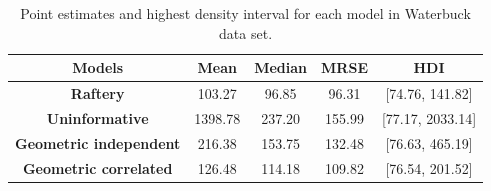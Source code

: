 \begin{table}[!ht]
    \centering
    \begin{tabular}{|c|c|c|c|c|}
        \hline
        {\bf Models} &     {\bf Mean} &  {\bf Median} &    {\bf MRSE} &    {\bf HDI} \\\hline
        {\bf Raftery} &   103.27 &   96.85 &   96.31 &   [74.76, 141.82] \\\hline
        {\bf Uninformative} &  1398.78 &  237.20 &  155.99 &  [77.17, 2033.14] \\\hline
        {\bf Geometric independent} &   216.38 &  153.75 &  132.48 &   [76.63, 465.19] \\\hline
        {\bf Geometric correlated} &   126.48 &  114.18 &  109.82 &   [76.54, 201.52] \\\hline
    \end{tabular}
    \caption{Point estimates and highest density interval for each model in Waterbuck data set.}
    \label{tab:summary-statistics-posterior-waterbuck}      
\end{table}